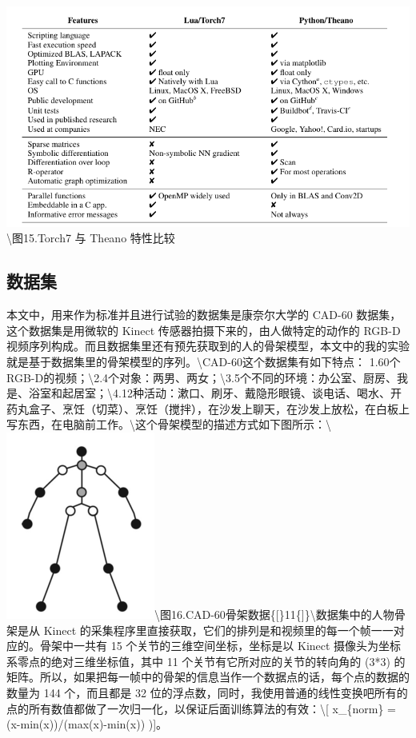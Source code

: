\includegraphics{picture/torch-vs-theano-feature.png}\textbackslash{}图15.Torch7
与 Theano 特性比较

\subsection{数据集}\label{ux6570ux636eux96c6}

本文中，用来作为标准并且进行试验的数据集是康奈尔大学的 CAD-60
数据集，这个数据集是用微软的 Kinect 传感器拍摄下来的，由人做特定的动作的
RGB-D
视频序列构成。而且数据集里还有预先获取到的人的骨架模型，本文中的我的实验就是基于数据集里的骨架模型的序列。\textbackslash{}CAD-60这个数据集有如下特点：
1.60个RGB-D的视频；\textbackslash{}2.4个对象：两男、两女；\textbackslash{}3.5个不同的环境：办公室、厨房、我是、浴室和起居室；\textbackslash{}4.12种活动：漱口、刷牙、戴隐形眼镜、谈电话、喝水、开药丸盒子、烹饪（切菜）、烹饪（搅拌），在沙发上聊天，在沙发上放松，在白板上写东西，在电脑前工作。\textbackslash{}这个骨架模型的描述方式如下图所示：\textbackslash{}\includegraphics{picture/skeleton.png}\textbackslash{}图16.CAD-60骨架数据\{{[}\}11\{{]}\}\textbackslash{}数据集中的人物骨架是从
Kinect
的采集程序里直接获取，它们的排列是和视频里的每一个帧一一对应的。骨架中一共有
15 个关节的三维空间坐标，坐标是以 Kinect
摄像头为坐标系零点的绝对三维坐标值，其中 11
个关节有它所对应的关节的转向角的 (3*3)
的矩阵。所以，如果把每一帧中的骨架的信息当作一个数据点的话，每个点的数据的数量为
144 个，而且都是 32
位的浮点数，同时，我使用普通的线性变换吧所有的点的所有数值都做了一次归一化，以保证后面训练算法的有效：\textbackslash{}{[}
x\_\{norm\} = (x-min(x))/(max(x)-min(x)) ){]}。

